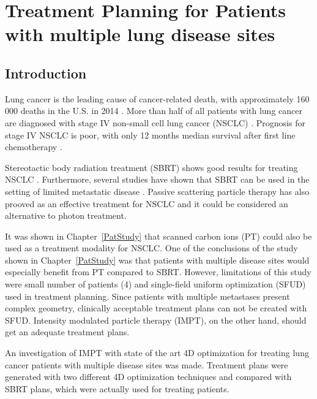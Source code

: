 \chapter{Treatment Planning for Patients with multiple lung disease sites}
\label{chapter:complex}
\minitoc

\section{Introduction}

Lung cancer is the leading cause of cancer-related death, with approximately 160 000 deaths in the U.S. in 2014 \cite{Siegel2014}.
More than half of all patients with lung cancer are diagnosed with stage IV non-small cell lung cancer (NSCLC) \cite{Ramalingam2008, Iyengar2014}.
Prognosis for stage IV NSCLC is poor, with only 12 months median survival after first line chemotherapy \cite{Socinski2013}. 

Stereotactic body radiation treatment (SBRT) shows good results for treating NSCLC \cite{Baumann2009, Fakiris2009, Grutters2010, Greco2011}. 
Furthermore, several studies have shown that SBRT can be used in the setting of limited metastatic 
disease \cite{Rusthoven2009, Villaruz2012, Salama2012, Iyengar2014}. 
Passive scattering particle therapy has also prooved as an effective treatment for NSCLC \cite{Grutters2010, Tsujii2012} and it could be considered an alternative
to photon treatment.

It was shown in Chapter~\ref{PatStudy} that scanned carbon ions (PT) could also be used as a treatment modality for NSCLC. One of the conclusions of the study shown in Chapter~\ref{PatStudy} 
was that patients with multiple disease sites would especially benefit from PT compared to SBRT. However, limitations of this study were small number of patients (4) and single-field uniform optimization (SFUD) used in treatment planning. 
Since patients with multiple metastases present complex geometry, clinically acceptable treatment plans can not be created with SFUD. Intensity modulated particle therapy (IMPT), on the other hand,
should get an adequate treatment plans.

An investigation of IMPT with state of the art 4D optimization for treating lung cancer patients with multiple disease sites was made. 
Treatment plans were generated with two different 4D optimization techniques and compared with SBRT plans, which were actually used for treating patients.



